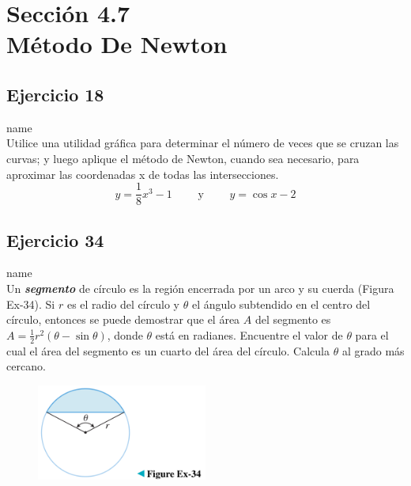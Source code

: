 \documentclass[12pt]{article}
\begin{document}
\section{Sección 4.7 \\ Método De Newton}
\subsection{Ejercicio 18} name \\

Utilice una utilidad gráfica para determinar el número de veces que se cruzan las curvas; y luego aplique el método de Newton, cuando sea necesario, para aproximar las coordenadas x de todas las intersecciones.
\[
y=\frac{1}{8}x^3-1 \qquad \text{ y } \qquad y=\cos{x}-2
\]

\subsection{Ejercicio 34} name \\

Un \textit{\textbf{segmento}} de círculo es la región encerrada por un arco y su cuerda (Figura Ex-34). Si $r$ es el radio del círculo y $\theta$ el ángulo subtendido en el centro del círculo, entonces se puede demostrar que el área $A$ del segmento es $A = \frac{1}{2}r^2 (\theta −\sin{\theta})$, donde $\theta$ está en radianes. Encuentre el valor de $\theta$ para el cual el área del segmento es un cuarto del área del círculo. Calcula $\theta$ al grado más cercano.

\begin{figure}[H]
\centering
\includegraphics[width=0.5\textwidth]{../img/img_Lista3/3_34.png}
\end{figure}
\end{document}
